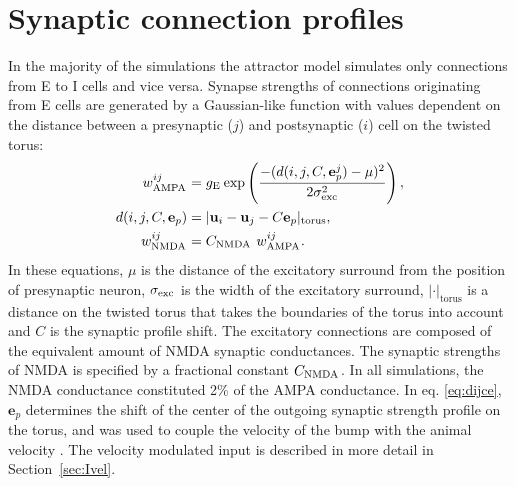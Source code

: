 \documentclass[a4paper,12pt]{article}
\newcommand{\ssc}[3]{\ensuremath{#1_{\text{#2}_{\text{#3}}}}}
\newcommand{\wAMPA   }{\ssc{w}      {\scriptsize{AMPA}}{}}
\newcommand{\wNMDA   }{\ssc{w}      {\scriptsize{NMDA}}{}}
\newcommand{\cNMDA   }{\ssc{C}      {\scriptsize{NMDA}}{}}
\newcommand{\sigmasub}[1]{\ssc{\sigma}{\scriptsize{#1}}{}}
\newcommand{\gE      }{\ssc{g}      {\scriptsize{E}}{}}
\newcommand{\dijce}{\ensuremath{d(i, j, C, \mathbf{e}_p^j)}}
\begin{document}


\section{Synaptic connection profiles} \label{conn_profiles}

In the majority of the simulations the attractor model 
simulates only connections from E to I cells and vice versa.
Synapse strengths of connections originating from E cells are generated by
a Gaussian-like function with values dependent on the distance between a
presynaptic ($j$) and postsynaptic ($i$) cell on the twisted torus:
\begin{align}
    \wAMPA^{ij} &= \gE \exp\left(
                   \frac{-(\dijce - \mu)^2}{2 \sigmasub{exc}^2}
                   \right), \label{eq:wAMPA} \\
    d(i, j, C, \mathbf{e}_p)  &= | \mathbf{u}_i - \mathbf{u}_j -
            C  \mathbf{e}_p |_{\mathrm{torus}}, \label{eq:dijce} \\
    \wNMDA^{ij} &= \cNMDA\ \wAMPA^{ij}. \label{eq:wNMDA}
\end{align}
In these equations, $\mu$ is the distance of the excitatory surround from the
position of presynaptic neuron, $\sigmasub{exc}$ is the width of the excitatory
surround, $|\cdot|_{\mathrm{torus}}$ is a distance on the twisted torus that
takes the boundaries of the torus into account and $C$ is the
synaptic profile shift. The excitatory connections are
composed of the equivalent amount of NMDA synaptic conductances. The synaptic
strengths of NMDA is specified by a fractional constant $\cNMDA$. In all
simulations, the NMDA conductance constituted 2\% of the AMPA conductance.
In eq. \eqref{eq:dijce}, $\mathbf{e}_p$ determines the shift of the center of
the outgoing synaptic strength profile on the torus, and was used to couple the
velocity of the bump with the animal velocity
\citep{Burak:2009fx,Pastoll:2013ff}. The velocity modulated input is described
in more detail in Section~\ref{sec:Ivel}.
\end{document}
